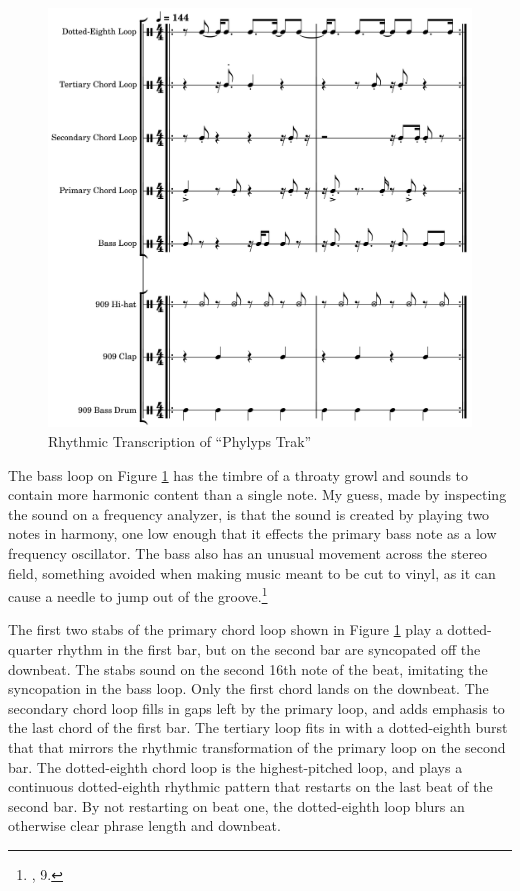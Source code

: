 \documentclass[12pt,twoside]{reedthesis}
\begin{document}
\begin{figure}
	\begin{centering}
		\includegraphics[width=6in]{./Images/PhylypsTrakNotation4}
		\caption{Rhythmic Transcription of ``Phylyps Trak''}
		\label{fig:phylyprytm}
	\end{centering}
\end{figure}

The bass loop on Figure \ref{fig:phylyprytm} has the timbre of a throaty growl and sounds to contain more harmonic content than a single note. My guess, made by inspecting the sound on a frequency analyzer, is that the sound is created by playing two notes in harmony, one low enough that it effects the primary bass note as a low frequency oscillator. The bass also has an unusual movement across the stereo field, something avoided when making music meant to be cut to vinyl, as it can cause a needle to jump out of the groove.\footnote{\cite{hooseTurningTablesEngineering2018}, 9.}

The first two stabs of the primary chord loop shown in Figure \ref{fig:phylyprytm} play a dotted-quarter rhythm in the first bar, but on the second bar are syncopated off the downbeat. The stabs sound on the second 16th note of the beat, imitating the syncopation in the bass loop. Only the first chord lands on the downbeat. The secondary chord loop fills in gaps left by the primary loop, and adds emphasis to the last chord of the first bar. The tertiary loop fits in with a dotted-eighth burst that that mirrors the rhythmic transformation of the primary loop on the second bar. The dotted-eighth chord loop is the highest-pitched loop, and plays a continuous dotted-eighth rhythmic pattern that restarts on the last beat of the second bar. By not restarting on beat one, the dotted-eighth loop blurs an otherwise clear phrase length and downbeat.
\end{document}
